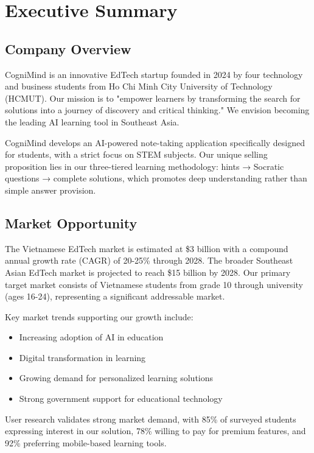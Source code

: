 \section{Executive Summary}

\subsection{Company Overview}
CogniMind is an innovative EdTech startup founded in 2024 by four technology and business students from Ho Chi Minh City University of Technology (HCMUT). Our mission is to "empower learners by transforming the search for solutions into a journey of discovery and critical thinking." We envision becoming the leading AI learning tool in Southeast Asia.

CogniMind develops an AI-powered note-taking application specifically designed for students, with a strict focus on STEM subjects. Our unique selling proposition lies in our three-tiered learning methodology: hints → Socratic questions → complete solutions, which promotes deep understanding rather than simple answer provision.

\subsection{Market Opportunity}
The Vietnamese EdTech market is estimated at \$3 billion with a compound annual growth rate (CAGR) of 20-25\% through 2028. The broader Southeast Asian EdTech market is projected to reach \$15 billion by 2028. Our primary target market consists of Vietnamese students from grade 10 through university (ages 16-24), representing a significant addressable market.

Key market trends supporting our growth include:
\begin{itemize}
    \item Increasing adoption of AI in education
    \item Digital transformation in learning
    \item Growing demand for personalized learning solutions
    \item Strong government support for educational technology
\end{itemize}

User research validates strong market demand, with 85\% of surveyed students expressing interest in our solution, 78\% willing to pay for premium features, and 92\% preferring mobile-based learning tools.

